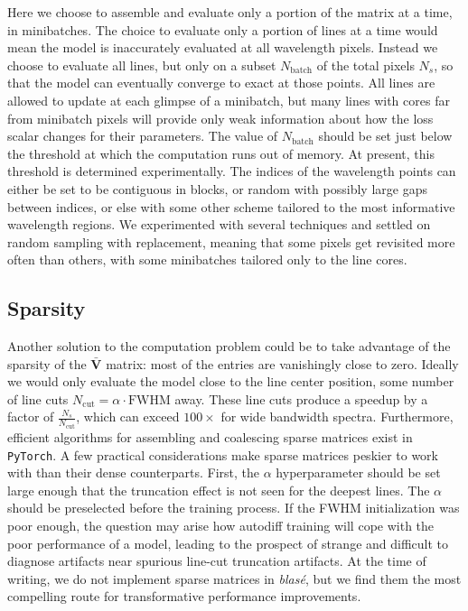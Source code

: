 \documentclass[modern]{aastex631}
\begin{document}
Here we choose to assemble and evaluate only a portion of the matrix at a time, in minibatches.  The choice to evaluate only a portion of lines at a time would mean the model is inaccurately evaluated at all wavelength pixels.  Instead we choose to evaluate all lines, but only on a subset $N_{\mathrm{batch}}$ of the total pixels $N_s$, so that the model can eventually converge to exact at those points.  All lines are allowed to update at each glimpse of a minibatch, but many lines with cores far from minibatch pixels will provide only weak information about how the loss scalar changes for their parameters.  The value of $N_{\mathrm{batch}}$ should be set just below the threshold at which the computation runs out of memory.  At present, this threshold is determined experimentally.  The indices of the wavelength points can either be set to be contiguous in blocks, or random with possibly large gaps between indices, or else with some other scheme tailored to the most informative wavelength regions.  We experimented with several techniques and settled on random sampling with replacement, meaning that some pixels get revisited more often than others, with some minibatches tailored only to the line cores.



\subsection{Sparsity}

Another solution to the computation problem could be to take advantage of the sparsity of the $\bm{\bar{V}}$ matrix: most of the entries are vanishingly close to zero.  Ideally we would only evaluate the model close to the line center position, some number of line cuts $N_{\mathrm{cut}}=\alpha \cdot \mathrm{FWHM}$ away.  These line cuts produce a speedup by a factor of $\frac{N_s}{N_{\mathrm{cut}}}$, which can exceed $100\times$ for wide bandwidth spectra. Furthermore, efficient algorithms for assembling and coalescing sparse matrices exist in \texttt{PyTorch}.  A few practical considerations make sparse matrices peskier to work with than their dense counterparts.  First, the $\alpha$ hyperparameter should be set large enough that the truncation effect is not seen for the deepest lines.  The $\alpha$ should be preselected before the training process.  If the FWHM initialization was poor enough, the question may arise how autodiff training will cope with the poor performance of a model, leading to the prospect of strange and difficult to diagnose artifacts near spurious line-cut truncation artifacts.  At the time of writing, we do not implement sparse matrices in \emph{blas\'e}, but we find them the most compelling route for transformative performance improvements.
\end{document}
